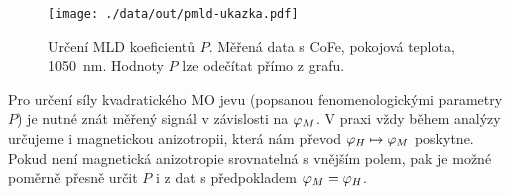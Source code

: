 \begin{figure}[htbp]
    \centering
    \texttt{[image: ./data/out/pmld-ukazka.pdf]}
    \caption{Určení MLD koeficientů $P$. Měřená data s CoFe, pokojová teplota, \SI{1050}{\nano\meter}. Hodnoty $P$ lze odečítat přímo z grafu.}
    \label{fig:urceni-MLD-ilustrace}
\end{figure}

Pro určení síly kvadratického MO jevu (popsanou fenomenologickými parametry $P$) je nutné znát měřený signál v závislosti na $\varphi_M$.
V praxi vždy během analýzy určujeme i magnetickou anizotropii, která nám převod $\varphi_H \mapsto \varphi_M$ poskytne.
Pokud není magnetická anizotropie srovnatelná s vnějším polem, pak je možné poměrně přesně určit $P$ i z dat s předpokladem $\varphi_M=\varphi_H$.

